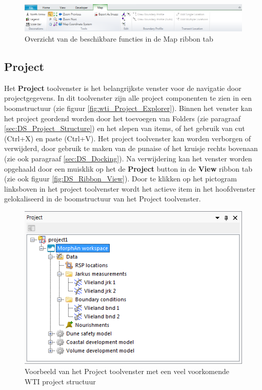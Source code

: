 \begin{figure}[H]
	\centering
		\includegraphics[width=1.0\textwidth]{figures/chapter_general/wti_Map.png}
		\caption{Overzicht van de beschikbare functies in de Map ribbon tab}
	\label{fig:wti_Ribbon_Map}
\end{figure}

\subsection{Project}
	\label{sec:DS_Project_Explorer}
Het \textbf{Project} toolvenster is het belangrijkste venster voor de navigatie door projectgegevens. In dit toolvenster zijn alle project componenten te zien in een boomstructuur (zie figuur \ref{fig:wti_Project_Explorer}). Binnen het venster kan het project geordend worden door het toevoegen van Folders (zie paragraaf \ref{sec:DS_Project_Structure}) en het slepen van items, of het gebruik van cut (Ctrl+X) en paste (Ctrl+V). Het project toolvenster kan worden verborgen of verwijderd, door gebruik te maken van de punaise of het kruisje rechts bovenaan (zie ook paragraaf \ref{sec:DS_Docking}). Na verwijdering kan het venster worden opgehaald door een muisklik op het de \textbf{Project} button in de \textbf{View} ribbon tab (zie ook figuur \ref{fig:DS_Ribbon_View}). Door te klikken op het pictogram linksboven in het project toolvenster wordt het actieve item in het hoofdvenster gelokaliseerd in de boomstructuur van het Project toolvenster.

\begin{figure}[H]
	\centering
		\includegraphics{figures/chapter_general/Project_Explorer_WTIData.png}
		\caption{Voorbeeld van het Project toolvenster met een veel voorkomende WTI project structuur}
	\label{fig:DS_Project_Explorer}
\end{figure}

